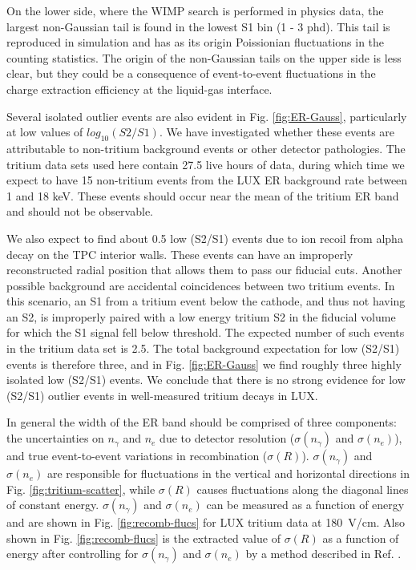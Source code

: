 On the lower side, where the WIMP search is performed in physics data, the largest non-Gaussian tail is found in the lowest S1 bin (1 - 3 phd). This tail is reproduced in simulation and has as its origin Poissionian fluctuations in the counting statistics. The origin of the non-Gaussian tails on the upper side is less clear, but they could be a consequence of event-to-event fluctuations in the charge extraction efficiency at the liquid-gas interface.

Several isolated outlier events are also evident in Fig. \ref{fig:ER-Gauss}, particularly at low values of $ log_{10}(S2/S1)$. We have investigated whether these events are attributable to non-tritium background events or other detector pathologies. The tritium data sets used here contain 27.5 live hours of data, during which time we expect to have 15 non-tritium events from the LUX ER background rate between 1 and 18 keV. These events should occur near the mean of the tritium ER band and should not be observable. 

We also expect to find about 0.5 low (S2/S1) events due to ion recoil from alpha decay on the TPC interior walls. These events can have an improperly reconstructed radial position that allows them to pass our fiducial cuts.  Another possible background are accidental coincidences between two tritium events. In this scenario, an S1 from a tritium event below the cathode, and thus not having an S2, is improperly paired with a low energy tritium S2 in the fiducial volume for which the S1 signal fell below threshold. The expected number of such events in the tritium data set is 2.5. The total background expectation for low (S2/S1) events is therefore three, and in Fig. \ref{fig:ER-Gauss} we find roughly three highly isolated low (S2/S1) events. We conclude that there is no strong evidence for low (S2/S1) outlier events in well-measured tritium decays in LUX.

In general the width of the ER band should be comprised of three components: the uncertainties on  $n_{\gamma}$ and $n_e$  due to detector resolution ($ \sigma(n_{\gamma})$ and $ \sigma(n_e)$), and true event-to-event variations in recombination ($ \sigma(R)$). $ \sigma(n_{\gamma})$ and $ \sigma(n_e)$ are responsible for fluctuations in the vertical  and horizontal directions in Fig. \ref{fig:tritium-scatter},  while 
$ \sigma(R)$ causes fluctuations along the diagonal lines of constant energy. $ \sigma(n_{\gamma})$ and $ \sigma(n_e)$ can be measured as a function of energy and are shown in Fig. \ref{fig:recomb-flucs} for LUX tritium data at 180~V/cm\cite{Dobi_Thesis}. Also shown in Fig. \ref{fig:recomb-flucs} is the extracted value of $ \sigma(R)$ as a function of energy after controlling for $ \sigma(n_{\gamma})$ and $ \sigma(n_e)$ by a method described in Ref. \cite{Dobi_Thesis}. 

